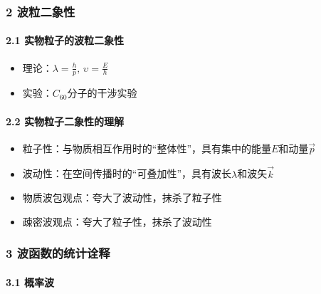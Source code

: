 \documentclass[UTF8,twocolumn]{ctexart}
\providecommand{\tightlist}{%
  \setlength{\itemsep}{0pt}\setlength{\parskip}{0pt}}
\let\oldparagraph\paragraph
\renewcommand{\paragraph}[1]{\oldparagraph{#1}\mbox{}}
\begin{document}
\hypertarget{ux6ce2ux7c92ux4e8cux8c61ux6027}{%
\subsubsection{2 波粒二象性}\label{ux6ce2ux7c92ux4e8cux8c61ux6027}}

\hypertarget{ux5b9eux7269ux7c92ux5b50ux7684ux6ce2ux7c92ux4e8cux8c61ux6027}{%
\paragraph{{ }2.1
实物粒子的波粒二象性}\label{ux5b9eux7269ux7c92ux5b50ux7684ux6ce2ux7c92ux4e8cux8c61ux6027}}

\begin{itemize}
\tightlist
\item
  理论：\(\lambda=\frac{h}{p},\,\upsilon=\frac{E}{h}\)
\item
  实验：\(C_{60}\)分子的干涉实验
\end{itemize}

\hypertarget{ux5b9eux7269ux7c92ux5b50ux4e8cux8c61ux6027ux7684ux7406ux89e3}{%
\paragraph{{ }2.2
实物粒子二象性的理解}\label{ux5b9eux7269ux7c92ux5b50ux4e8cux8c61ux6027ux7684ux7406ux89e3}}

\begin{itemize}
\tightlist
\item
  粒子性：与物质相互作用时的``整体性''，具有集中的能量\(E\)和动量\(\vec{p}\)
\item
  波动性：在空间传播时的``可叠加性''，具有波长\(\lambda\)和波矢\(\vec{k}\)
\item
  物质波包观点：夸大了波动性，抹杀了粒子性
\item
  疎密波观点：夸大了粒子性，抹杀了波动性
\end{itemize}

\hypertarget{ux6ce2ux51fdux6570ux7684ux7edfux8ba1ux8be0ux91ca}{%
\subsubsection{3
波函数的统计诠释}\label{ux6ce2ux51fdux6570ux7684ux7edfux8ba1ux8be0ux91ca}}

\hypertarget{ux6982ux7387ux6ce2}{%
\paragraph{{ }3.1 概率波}\label{ux6982ux7387ux6ce2}}
\end{document}
